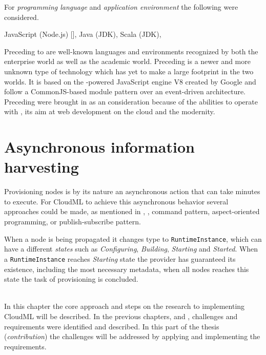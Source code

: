 For \emph{programming language} and \emph{application environment} the following were considered.
\begin{ii}
  \iitem JavaScript (Node.js) [],
  \iitem Java (JDK),
  \iitem Scala (JDK),
\end{ii}
Preceding  to  are well-known languages and environments recognized by both the enterprise world as well as the academic world.
Preceding  is a newer and more unknown type of technology which has yet to 
make a large footprint in the two worlds. 
It is based on the -powered JavaScript engine V8 created by Google and follow a 
CommonJS-based module pattern over an event-driven architecture.
Preceding  were brought in as an consideration because of the abilities to operate
with , its aim at web development on the cloud and the modernity.

\section{Asynchronous information harvesting}

Provisioning nodes is by its nature an asynchronous action that can take minutes to execute.
For CloudML to achieve this asynchronous behavior several approaches could be made,
as mentioned in , \eg, command pattern, aspect-oriented programming,
or publish-subscribe pattern.

When a node is being propagated it changes type to \texttt{RuntimeInstance}, 
which can have a different \emph{states} such as \emph{Configuring}, \emph{Building}, \emph{Starting} and \emph{Started}.
When a \texttt{RuntimeInstance} reaches \emph{Starting} state the provider has guaranteed its existence, including
the most necessary metadata, when all nodes reaches this state the task of provisioning is concluded.

\hr 

 \\
In this chapter the core approach and steps on the research to implementing CloudML will be described.
In the previous chapters,  and , 
challenges and requirements were identified and described.
In this part of the thesis (\emph{contribution}) the challenges will be addressed 
by applying and implementing the requirements.

